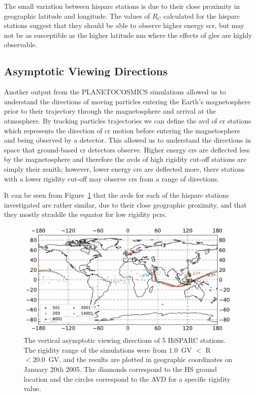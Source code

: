 The small variation between \gls{hisparc} stations is due to their close proximity in geographic latitude and longitude. The values of $R_C$ calculated for the \gls{hisparc} stations suggest that they should be able to observe higher energy \gls{scr}, but may not be as susceptible as the higher latitude \gls{nm} where the effects of \glspl{gle} are highly observable.

\subsection{Asymptotic Viewing Directions}

Another output from the PLANETOCOSMICS simulations allowed us to understand the directions of moving particles entering the Earth's magnetosphere prior to their trajectory through the magnetosphere and arrival at the atmosphere. By tracking particles trajectories we can define the \gls{avd} of \gls{cr} stations which represents the direction of \gls{cr} motion before entering the magnetosphere and being observed by a detector. This allowed us to understand the directions in space that ground-based \gls{cr} detectors observe. Higher energy \glspl{cr} are deflected less by the magnetosphere and therefore the \glspl{avd} of high rigidity cut-off stations are simply their zenith; however, lower energy \glspl{cr} are deflected more, there stations with a lower rigidity cut-off may observe \glspl{cr} from a range of directions.

It can be seen from Figure~\ref{fig:HS_AVD} that the \glspl{avd} for each of the \gls{hisparc} stations investigated are rather similar, due to their close geographic proximity, and that they mostly straddle the equator for low rigidity \glspl{pcr}. 

\begin{figure}[ht!]
	\centering
	\includegraphics[scale=0.6]{HS_AVDs.pdf}
	\caption{The vertical asymptotic viewing directions of 5 HiSPARC stations. The rigidity range of the simulations were from $1.0$~GV $<$ R $<20.0$~GV, and the results are plotted in geographic coordinates on January 20th 2005. The diamonds correspond to the HS ground location and the circles correspond to the AVD for a specific rigidity value.}
	\label{fig:HS_AVD}
\end{figure}

